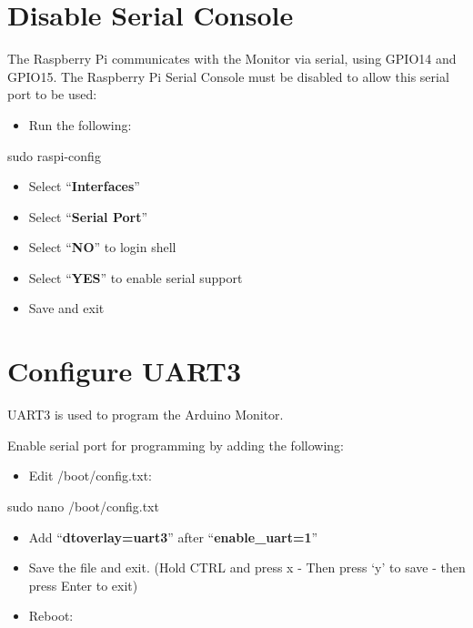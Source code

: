 \documentclass[
  letterpaper,
]{scrbook}
\newenvironment{Shaded}{\begin{snugshade}}{\end{snugshade}}
\newcommand{\FunctionTok}[1]{\textcolor[rgb]{0.28,0.35,0.67}{#1}}
\newcommand{\NormalTok}[1]{\textcolor[rgb]{0.00,0.23,0.31}{#1}}
\providecommand{\tightlist}{%
  \setlength{\itemsep}{0pt}\setlength{\parskip}{0pt}}
\begin{document}
\section{Disable Serial Console}\label{disable-serial-console}

The Raspberry Pi communicates with the Monitor via serial, using GPIO14
and GPIO15. The Raspberry Pi Serial Console must be disabled to allow
this serial port to be used:

\begin{itemize}
\tightlist
\item
  Run the following:
\end{itemize}

\begin{Shaded}
\begin{Highlighting}[]
\FunctionTok{sudo}\NormalTok{ raspi{-}config}
\end{Highlighting}
\end{Shaded}

\begin{itemize}
\item
  Select ``\textbf{Interfaces}''
\item
  Select ``\textbf{Serial Port}''
\item
  Select ``\textbf{NO}'' to login shell
\item
  Select ``\textbf{YES}'' to enable serial support
\item
  Save and exit
\end{itemize}

\section{Configure UART3}\label{configure-uart3}

UART3 is used to program the Arduino Monitor.

Enable serial port for programming by adding the following:

\begin{itemize}
\tightlist
\item
  Edit /boot/config.txt:
\end{itemize}

\begin{Shaded}
\begin{Highlighting}[]
\FunctionTok{sudo}\NormalTok{ nano /boot/config.txt}
\end{Highlighting}
\end{Shaded}

\begin{itemize}
\item
  Add ``\textbf{dtoverlay=uart3}'' after ``\textbf{enable\_uart=1}''
\item
  Save the file and exit. (Hold CTRL and press x - Then press `y' to
  save - then press Enter to exit)
\item
  Reboot:
\end{itemize}
\end{document}
